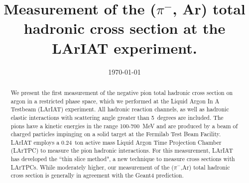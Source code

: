 \documentclass[%
 floatfix,
 reprint,
 twocolumn,
superscriptaddress,
showpacs,preprintnumbers,
 amsmath,amssymb,
 aps,
prd,
]{revtex4-1}
\begin{document}
\widetext


\title{Measurement of the  ($\pi^-$, Ar) total hadronic cross section  at the LArIAT experiment.}




\date{\today}



\begin{abstract}
We present the first measurement of the negative pion total hadronic cross section on argon in a restricted phase space, which we performed at the Liquid Argon In A Testbeam (LArIAT)  experiment. All hadronic reaction channels, as well as hadronic elastic interactions with scattering angle greater than 5~degrees are included. The pions have a kinetic energies in the range 100-700~MeV and are produced by a beam of charged particles impinging on a solid target at the Fermilab Test Beam Facility. LArIAT employs a 0.24~ton active mass Liquid Argon Time Projection Chamber (LArTPC) to measure the pion hadronic interactions. For this measurement, LArIAT has developed the ``thin slice method", a new technique to measure cross sections with LArTPCs.  While moderately higher, our measurement of the  ($\pi^-$,Ar) total hadronic cross section is generally in agreement with the Geant4 prediction.
\end{abstract}

\maketitle
\end{document}
